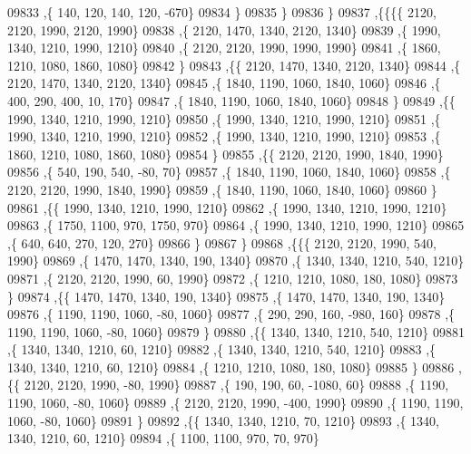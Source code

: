 \begin{DoxyCode}
09833     ,\{   140,   120,   140,   120,  -670\}
09834     \}
09835    \}
09836   \}
09837  ,\{\{\{\{  2120,  2120,  1990,  2120,  1990\}
09838     ,\{  2120,  1470,  1340,  2120,  1340\}
09839     ,\{  1990,  1340,  1210,  1990,  1210\}
09840     ,\{  2120,  2120,  1990,  1990,  1990\}
09841     ,\{  1860,  1210,  1080,  1860,  1080\}
09842     \}
09843    ,\{\{  2120,  1470,  1340,  2120,  1340\}
09844     ,\{  2120,  1470,  1340,  2120,  1340\}
09845     ,\{  1840,  1190,  1060,  1840,  1060\}
09846     ,\{   400,   290,   400,    10,   170\}
09847     ,\{  1840,  1190,  1060,  1840,  1060\}
09848     \}
09849    ,\{\{  1990,  1340,  1210,  1990,  1210\}
09850     ,\{  1990,  1340,  1210,  1990,  1210\}
09851     ,\{  1990,  1340,  1210,  1990,  1210\}
09852     ,\{  1990,  1340,  1210,  1990,  1210\}
09853     ,\{  1860,  1210,  1080,  1860,  1080\}
09854     \}
09855    ,\{\{  2120,  2120,  1990,  1840,  1990\}
09856     ,\{   540,   190,   540,   -80,    70\}
09857     ,\{  1840,  1190,  1060,  1840,  1060\}
09858     ,\{  2120,  2120,  1990,  1840,  1990\}
09859     ,\{  1840,  1190,  1060,  1840,  1060\}
09860     \}
09861    ,\{\{  1990,  1340,  1210,  1990,  1210\}
09862     ,\{  1990,  1340,  1210,  1990,  1210\}
09863     ,\{  1750,  1100,   970,  1750,   970\}
09864     ,\{  1990,  1340,  1210,  1990,  1210\}
09865     ,\{   640,   640,   270,   120,   270\}
09866     \}
09867    \}
09868   ,\{\{\{  2120,  2120,  1990,   540,  1990\}
09869     ,\{  1470,  1470,  1340,   190,  1340\}
09870     ,\{  1340,  1340,  1210,   540,  1210\}
09871     ,\{  2120,  2120,  1990,    60,  1990\}
09872     ,\{  1210,  1210,  1080,   180,  1080\}
09873     \}
09874    ,\{\{  1470,  1470,  1340,   190,  1340\}
09875     ,\{  1470,  1470,  1340,   190,  1340\}
09876     ,\{  1190,  1190,  1060,   -80,  1060\}
09877     ,\{   290,   290,   160,  -980,   160\}
09878     ,\{  1190,  1190,  1060,   -80,  1060\}
09879     \}
09880    ,\{\{  1340,  1340,  1210,   540,  1210\}
09881     ,\{  1340,  1340,  1210,    60,  1210\}
09882     ,\{  1340,  1340,  1210,   540,  1210\}
09883     ,\{  1340,  1340,  1210,    60,  1210\}
09884     ,\{  1210,  1210,  1080,   180,  1080\}
09885     \}
09886    ,\{\{  2120,  2120,  1990,   -80,  1990\}
09887     ,\{   190,   190,    60, -1080,    60\}
09888     ,\{  1190,  1190,  1060,   -80,  1060\}
09889     ,\{  2120,  2120,  1990,  -400,  1990\}
09890     ,\{  1190,  1190,  1060,   -80,  1060\}
09891     \}
09892    ,\{\{  1340,  1340,  1210,    70,  1210\}
09893     ,\{  1340,  1340,  1210,    60,  1210\}
09894     ,\{  1100,  1100,   970,    70,   970\}

\end{DoxyCode}
